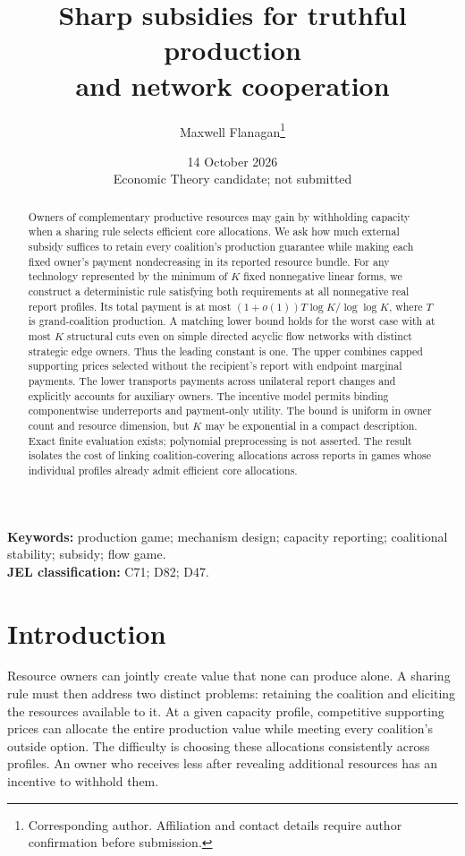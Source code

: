 \documentclass[11pt]{article}
\title{Sharp subsidies for truthful production\\and network cooperation}
\author{Maxwell Flanagan\thanks{Corresponding author. Affiliation and contact details require author confirmation before submission.}}
\date{14 October 2026\\[2pt]\small Economic Theory candidate; not submitted}
\theoremstyle{definition}\newtheorem{definition}[theorem]{Definition}
\theoremstyle{remark}\newtheorem{remark}[theorem]{Remark}
\begin{document}
\maketitle
\begin{abstract}
Owners of complementary productive resources may gain by withholding capacity
when a sharing rule selects efficient core allocations. We ask how much
external subsidy suffices to retain every coalition's production guarantee
while making each fixed owner's payment nondecreasing in its reported
resource bundle. For any technology represented by the minimum of $K$ fixed
nonnegative linear forms, we construct a deterministic rule satisfying both
requirements at all nonnegative real report profiles. Its total payment is
at most $(1+o(1))T\log K/\log\log K$, where $T$ is grand-coalition production.
A matching lower bound holds for the worst case with at most $K$ structural
cuts even on simple directed acyclic flow networks with distinct strategic
edge owners. Thus the leading constant is one. The upper combines capped
supporting prices selected without the recipient's report with endpoint
marginal payments. The lower transports payments across unilateral report
changes and explicitly accounts for auxiliary owners. The incentive model
permits binding componentwise underreports and payment-only utility.
The bound is uniform in owner count and resource dimension, but $K$ may be
exponential in a compact description. Exact finite evaluation exists;
polynomial preprocessing is not asserted. The result isolates the cost of
linking coalition-covering allocations across reports in games whose
individual profiles already admit efficient core allocations.
\end{abstract}
\noindent\textbf{Keywords:} production game; mechanism design; capacity reporting;
coalitional stability; subsidy; flow game.\\
\textbf{JEL classification:} C71; D82; D47.

\section{Introduction}
Resource owners can jointly create value that none can produce alone. A
sharing rule must then address two distinct problems: retaining the coalition
and eliciting the resources available to it. At a given capacity profile,
competitive supporting prices can allocate the entire production value while
meeting every coalition's outside option. The difficulty is choosing these
allocations consistently across profiles. An owner who receives less after
revealing additional resources has an incentive to withhold them.
\end{document}
